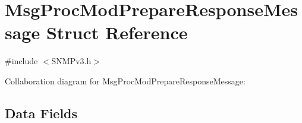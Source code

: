\hypertarget{struct_msg_proc_mod_prepare_response_message}{}\section{Msg\+Proc\+Mod\+Prepare\+Response\+Message Struct Reference}
\label{struct_msg_proc_mod_prepare_response_message}


{\ttfamily \#include $<$S\+N\+M\+Pv3.\+h$>$}



Collaboration diagram for Msg\+Proc\+Mod\+Prepare\+Response\+Message\+:
\subsection*{Data Fields}
